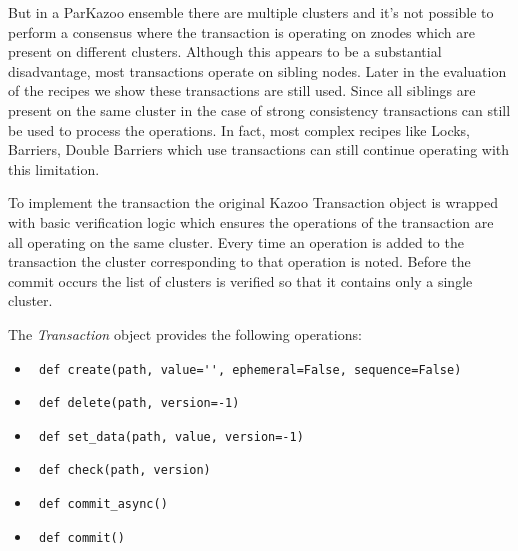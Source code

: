 But in a ParKazoo ensemble there are multiple clusters and it's not possible to perform a consensus where the transaction is operating on znodes which are present on different clusters. Although this appears to be a substantial disadvantage, most transactions operate on sibling nodes. Later in the evaluation of the recipes we show these transactions are still used. Since all siblings are present on the same cluster in the case of strong consistency transactions can still be used to process the operations. In fact, most complex recipes like Locks, Barriers, Double Barriers which use transactions can still continue operating with this limitation.
    
To implement the transaction the original Kazoo Transaction object is wrapped with basic verification logic which ensures the operations of the transaction are all operating on the same cluster. Every time an operation is added to the transaction the cluster corresponding to that operation is noted. Before the commit occurs the list of clusters is verified so that it contains only a single cluster.
    
The \textit{Transaction} object provides the following operations:
\begin{itemize}
	\item \lstinline | def create(path, value='', ephemeral=False, sequence=False) |
	\item \lstinline | def delete(path, version=-1) |
	\item \lstinline | def set_data(path, value, version=-1) |
	\item \lstinline | def check(path, version) |
	\item \lstinline | def commit_async() |
	\item \lstinline | def commit() |
\end{itemize}